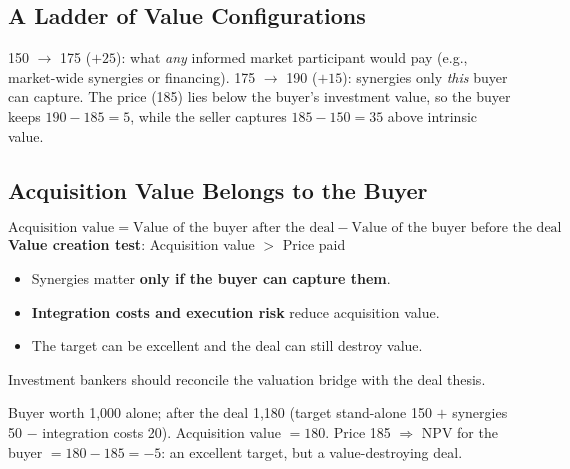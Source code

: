 \subsection{A Ladder of Value Configurations}
\begin{center}
\end{center}
\begin{addbox}
150 $\to$ 175 ($+25$): what \emph{any} informed market participant would pay (e.g., market-wide synergies or financing). 175 $\to$ 190 ($+15$): synergies only \emph{this} buyer can capture. The price (185) lies below the buyer's investment value, so the buyer keeps $190-185=5$, while the seller captures $185-150=35$ above intrinsic value.
\end{addbox}

\subsection{Acquisition Value Belongs to the Buyer}
\begin{keybox}
\[
\text{Acquisition value}=\text{Value of the buyer after the deal}-\text{Value of the buyer before the deal}
\]
\textbf{Value creation test}: \qquad Acquisition value $>$ Price paid
\end{keybox}
\begin{itemize}
  \item Synergies matter \textbf{only if the buyer can capture them}.
  \item \textbf{Integration costs and execution risk} reduce acquisition value.
  \item The target can be excellent and the deal can still destroy value.
\end{itemize}
Investment bankers should reconcile the valuation bridge with the deal thesis.
\begin{exbox}
Buyer worth 1,000 alone; after the deal 1,180 (target stand-alone 150 $+$ synergies 50 $-$ integration costs 20). Acquisition value $=180$. Price 185 $\Rightarrow$ NPV for the buyer $=180-185=-5$: an excellent target, but a value-destroying deal.
\end{exbox}

